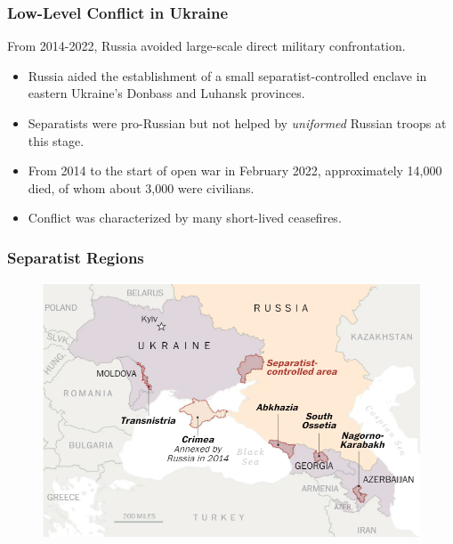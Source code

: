 \documentclass[handout]{beamer}
\begin{document}
\begin{frame} 
	\frametitle{\LARGE{Low-Level Conflict in Ukraine}}
	From 2014-2022, Russia avoided large-scale direct military confrontation.
	\begin{itemize}
		\item Russia aided the establishment of a small separatist-controlled enclave in eastern Ukraine's Donbass and Luhansk provinces. \pause
		\item Separatists were pro-Russian but not helped by \textit{uniformed} Russian troops at this stage. \pause
		\item From 2014 to the start of open war in February 2022, approximately 14,000 died, of whom about 3,000 were civilians. \pause
		\item Conflict was characterized by many short-lived ceasefires.
	\end{itemize}
\end{frame}

\begin{frame} 
	\frametitle{\LARGE{Separatist Regions}}
	\begin{figure}[ht!]
		\centering
		\includegraphics[width=\textwidth,height=\textheight, keepaspectratio]{sep1.png}
	\end{figure}
\end{frame}
\end{document}
